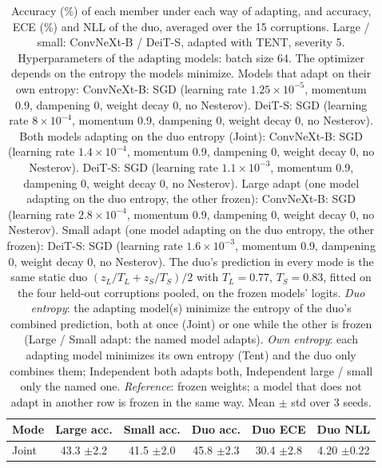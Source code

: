 \begin{table}[t]
    \centering
    \small
    \caption{Accuracy (\%) of each member under each way of adapting, and accuracy, ECE (\%) and NLL of the duo, averaged over the 15 corruptions. Large / small: ConvNeXt-B / DeiT-S, adapted with TENT, severity 5. Hyperparameters of the adapting models: batch size 64. The optimizer depends on the entropy the models minimize. Models that adapt on their own entropy: ConvNeXt-B: SGD (learning rate $1.25 \times 10^{-5}$, momentum 0.9, dampening 0, weight decay 0, no Nesterov). DeiT-S: SGD (learning rate $8 \times 10^{-4}$, momentum 0.9, dampening 0, weight decay 0, no Nesterov). Both models adapting on the duo entropy (Joint): ConvNeXt-B: SGD (learning rate $1.4 \times 10^{-4}$, momentum 0.9, dampening 0, weight decay 0, no Nesterov). DeiT-S: SGD (learning rate $1.1 \times 10^{-3}$, momentum 0.9, dampening 0, weight decay 0, no Nesterov). Large adapt (one model adapting on the duo entropy, the other frozen): ConvNeXt-B: SGD (learning rate $2.8 \times 10^{-4}$, momentum 0.9, dampening 0, weight decay 0, no Nesterov). Small adapt (one model adapting on the duo entropy, the other frozen): DeiT-S: SGD (learning rate $1.6 \times 10^{-3}$, momentum 0.9, dampening 0, weight decay 0, no Nesterov). The duo's prediction in every mode is the same static duo $(z_L / T_L + z_S / T_S) / 2$ with $T_L = 0.77$, $T_S = 0.83$, fitted on the four held-out corruptions pooled, on the frozen models' logits. \emph{Duo entropy}: the adapting model(s) minimize the entropy of the duo's combined prediction, both at once (Joint) or one while the other is frozen (Large / Small adapt: the named model adapts). \emph{Own entropy}: each adapting model minimizes its own entropy (Tent) and the duo only combines them; Independent both adapts both, Independent large / small only the named one. \emph{Reference}: frozen weights; a model that does not adapt in another row is frozen in the same way. Mean $\pm$ std over 3 seeds.}
    \label{tab:adaptation_modes_summary:tent__convnextb_deits_bn}
    \begin{tabular}{lccccc}
        \toprule
        Mode & Large acc. & Small acc. & Duo acc. & Duo ECE & Duo NLL \\
        \midrule
        Joint & 43.3 {\scriptsize$\pm$2.2} & 41.5 {\scriptsize$\pm$2.0} & 45.8 {\scriptsize$\pm$2.3} & 30.4 {\scriptsize$\pm$2.8} & 4.20 {\scriptsize$\pm$0.22} \\

\end{tabular}
\end{table}
